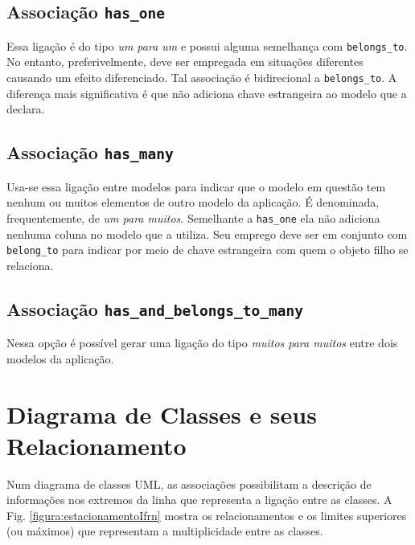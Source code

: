 \subsection{Associação \texttt{has\_one}}
Essa ligação é do tipo \textit{um para um} e possui alguma semelhança com  \texttt{belongs\_to}. No entanto, preferivelmente, deve ser empregada em situações diferentes causando um efeito diferenciado. Tal associação é bidirecional a \texttt{belongs\_to}. A diferença mais significativa  é que não adiciona chave estrangeira ao modelo que a declara. 

\subsection{Associação \texttt{has\_many}}
Usa-se essa ligação entre modelos para indicar que o modelo em questão tem nenhum ou muitos elementos de outro modelo da aplicação. É denominada, frequentemente, de \textit{um para muitos}. Semelhante a \texttt{has\_one} ela não adiciona nenhuma coluna no modelo que a utiliza. Seu emprego deve ser em conjunto com \texttt{belong\_to} para indicar por meio de chave estrangeira com quem o objeto filho se relaciona. 

\subsection{Associação \texttt{has\_and\_belongs\_to\_many}}
Nessa opção é possível gerar uma ligação do tipo \textit{muitos para muitos} entre dois modelos da aplicação.
\section{Diagrama de Classes e seus Relacionamento}
Num diagrama de classes UML, as associações possibilitam a descrição de informações  nos extremos da linha que representa a ligação entre as classes. A Fig. \ref{figura:estacionamentoIfrn}
mostra os relacionamentos e os limites superiores (ou máximos) que representam a multiplicidade entre as classes.

